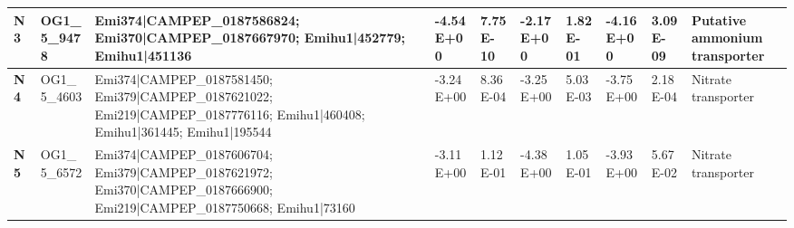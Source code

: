 \begin{landscape}
\begin{center}
\begin{footnotesize}
\begin{longtable}{|p{0.5cm}|p{1.5cm}|p{4cm}|l|l|l|l|l|l|l|}
\textbf{N3}  & OG1\_5\_9478  & Emi374|CAMPEP\_0187586824; Emi370|CAMPEP\_0187667970; Emihu1|452779; Emihu1|451136                                                                                                                                                                                                                                                                                                                                                                                                                                                                                                                                                       & -4.54E+00 & 7.75E-10 & -2.17E+00 & 1.82E-01 & -4.16E+00 & 3.09E-09 & Putative ammonium transporter                                                \\ \hline
\textbf{N4}  & OG1\_5\_4603  & Emi374|CAMPEP\_0187581450; Emi379|CAMPEP\_0187621022; Emi219|CAMPEP\_0187776116; Emihu1|460408; Emihu1|361445; Emihu1|195544                                                                                                                                                                                                                                                                                                                                                                                                                                                                                                             & -3.24E+00 & 8.36E-04 & -3.25E+00 & 5.03E-03 & -3.75E+00 & 2.18E-04 & Nitrate transporter                                                          \\ \hline
\textbf{N5}  & OG1\_5\_6572  & Emi374|CAMPEP\_0187606704; Emi379|CAMPEP\_0187621972; Emi370|CAMPEP\_0187666900; Emi219|CAMPEP\_0187750668; Emihu1|73160                                                                                                                                                                                                                                                                                                                                                                                                                                                                                                                 & -3.11E+00 & 1.12E-01 & -4.38E+00 & 1.05E-01 & -3.93E+00 & 5.67E-02 & Nitrate transporter                                                          \\ \hline

\end{longtable}
\end{footnotesize}
\end{center}
\end{landscape}
